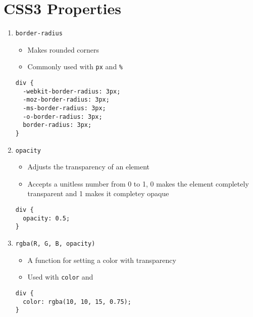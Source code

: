 \documentclass[10pt, twocolumn]{article}
\begin{document}
\section{CSS3 Properties}
\begin{enumerate}

\item \texttt{border-radius}
\begin{itemize}
\item Makes rounded corners
\item Commonly used with \texttt{px} and \texttt{\%}
\end{itemize}
\begin{lstlisting}[frame=single]
div {
  -webkit-border-radius: 3px;
  -moz-border-radius: 3px;
  -ms-border-radius: 3px;
  -o-border-radius: 3px;
  border-radius: 3px;
}
\end{lstlisting}

\item \texttt{opacity}
\begin{itemize}
\item Adjusts the transparency of an element 
\item Accepts a unitless number from 0 to 1, 0 makes the element completely transparent and 1 makes it completey opaque
\end{itemize}
\begin{lstlisting}[frame=single]
div {
  opacity: 0.5;
}
\end{lstlisting}

\item \texttt{rgba(R, G, B, opacity)}
\begin{itemize}
\item A function for setting a color with transparency
\item Used with \texttt{color} and 
\end{itemize}
\begin{lstlisting}[frame=single]
div {
  color: rgba(10, 10, 15, 0.75);
}
\end{lstlisting}


\end{enumerate}
\end{document}
